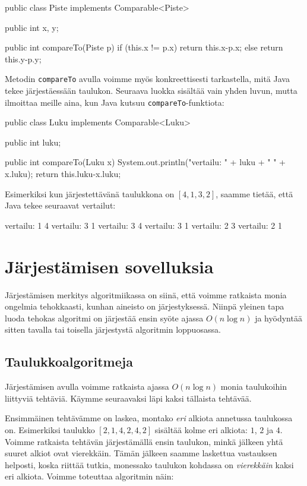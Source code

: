 \begin{code}
public class Piste implements Comparable<Piste> {
    public int x, y;

    public int compareTo(Piste p) {
        if (this.x != p.x) {
            return this.x-p.x;
        } else {
            return this.y-p.y;
        }
    }
}
\end{code}

Metodin \texttt{compareTo} avulla voimme myös konkreettisesti
tarkastella, mitä Java tekee järjestäessään taulukon.
Seuraava luokka sisältää vain yhden luvun,
mutta ilmoittaa meille aina, kun Java kutsuu
\texttt{compareTo}-funktiota:

\begin{code}
public class Luku implements Comparable<Luku> {
    public int luku;

    public int compareTo(Luku x) {
        System.out.println("vertailu: " + luku + " " + x.luku);
        return this.luku-x.luku;
    }
}
\end{code}

Esimerkiksi kun järjestettävänä taulukkona on $[4,1,3,2]$,
saamme tietää, että Java tekee seuraavat vertailut:

\begin{code}
vertailu: 1 4
vertailu: 3 1
vertailu: 3 4
vertailu: 3 1
vertailu: 2 3
vertailu: 2 1
\end{code}

\section{Järjestämisen sovelluksia}

Järjestämisen merkitys algoritmiikassa on siinä,
että voimme ratkaista monia ongelmia tehokkaasti, 
kunhan aineisto on järjestyksessä.
Niinpä yleinen tapa luoda tehokas algoritmi on järjestää
ensin syöte ajassa $O(n \log n)$ ja hyödyntää sitten
tavalla tai toisella järjestystä algoritmin loppuosassa.

\subsection{Taulukkoalgoritmeja}

\label{sec:taukas}

Järjestämisen avulla voimme ratkaista ajassa
$O(n \log n)$ monia taulukoihin liittyviä tehtäviä.
Käymme seuraavaksi läpi kaksi tällaista tehtävää.

Ensimmäinen tehtävämme on laskea,
montako \emph{eri} alkiota annetussa taulukossa on.
Esimerkiksi taulukko $[2,1,4,2,4,2]$ sisältää kolme
eri alkiota: $1$, $2$ ja $4$.
Voimme ratkaista tehtävän järjestämällä ensin taulukon,
minkä jälkeen yhtä suuret alkiot ovat vierekkäin.
Tämän jälkeen saamme laskettua vastauksen helposti,
koska riittää tutkia, monessako taulukon kohdassa on
\emph{vierekkäin} kaksi eri alkiota.
Voimme toteuttaa algoritmin näin:

